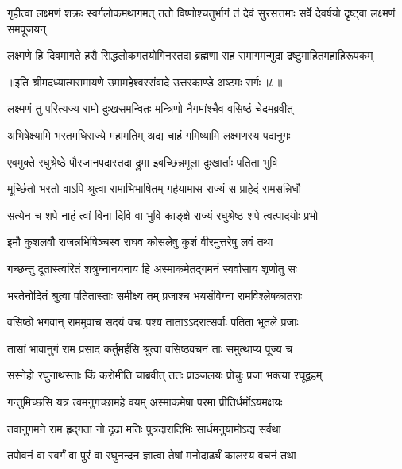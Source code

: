 \threelineshloka
{गृहीत्वा लक्ष्मणं शक्रः स्वर्गलोकमथागमत्}
{ततो विष्णोश्चतुर्भागं तं देवं सुरसत्तमाः}
{सर्वे देवर्षयो दृष्ट्वा लक्ष्मणं समपूजयन्} %

\twolineshloka
{लक्ष्मणे हि दिवमागते हरौ सिद्धलोकगतयोगिनस्तदा}
{ब्रह्मणा सह समागमन्मुदा द्रष्टुमाहितमहाहिरूपकम्} %

{॥इति श्रीमदध्यात्मरामायणे उमामहेश्वरसंवादे उत्तरकाण्डे अष्टमः
सर्गः॥८॥}





\twolineshloka
{लक्ष्मणं तु परित्यज्य रामो दुःखसमन्वितः}
{मन्त्रिणो नैगमांश्चैव वसिष्ठं चेदमब्रवीत्} %

\twolineshloka
{अभिषेक्ष्यामि भरतमधिराज्ये महामतिम्}
{अद्य चाहं गमिष्यामि लक्ष्मणस्य पदानुगः} %

\twolineshloka
{एवमुक्ते रघुश्रेष्ठे पौरजानपदास्तदा}
{द्रुमा इवच्छिन्नमूला दुःखार्ताः पतिता भुवि} %

\twolineshloka
{मूर्च्छितो भरतो वाऽपि श्रुत्वा रामाभिभाषितम्}
{गर्हयामास राज्यं स प्राहेदं रामसन्निधौ} %

\twolineshloka
{सत्येन च शपे नाहं त्वां विना दिवि वा भुवि}
{काङ्क्षे राज्यं रघुश्रेष्ठ शपे त्वत्पादयोः प्रभो} %

\twolineshloka
{इमौ कुशलवौ राजन्नभिषिञ्चस्व राघव}
{कोसलेषु कुशं वीरमुत्तरेषु लवं तथा} %

\twolineshloka
{गच्छन्तु दूतास्त्वरितं शत्रुघ्नानयनाय हि}
{अस्माकमेतद्गमनं स्वर्वासाय शृणोतु सः} %

\twolineshloka
{भरतेनोदितं श्रुत्वा पतितास्ताः समीक्ष्य तम्}
{प्रजाश्च भयसंविग्ना रामविश्लेषकातराः} %

\twolineshloka
{वसिष्ठो भगवान् राममुवाच सदयं वचः}
{पश्य ताताऽऽदरात्सर्वाः पतिता भूतले प्रजाः} %

\twolineshloka
{तासां भावानुगं राम प्रसादं कर्तुमर्हसि}
{श्रुत्वा वसिष्ठवचनं ताः समुत्थाप्य पूज्य च} %

\twolineshloka
{सस्नेहो रघुनाथस्ताः किं करोमीति चाब्रवीत्}
{ततः प्राञ्जलयः प्रोचुः प्रजा भक्त्या रघूद्वहम्} %

\twolineshloka
{गन्तुमिच्छसि यत्र त्वमनुगच्छामहे वयम्}
{अस्माकमेषा परमा प्रीतिर्धर्मोऽयमक्षयः} %

\twolineshloka
{तवानुगमने राम हृद्गता नो दृढा मतिः}
{पुत्रदारादिभिः सार्धमनुयामोऽद्य सर्वथा} %

\twolineshloka
{तपोवनं वा स्वर्गं वा पुरं वा रघुनन्दन}
{ज्ञात्वा तेषां मनोदार्ढ्यं कालस्य वचनं तथा} %

